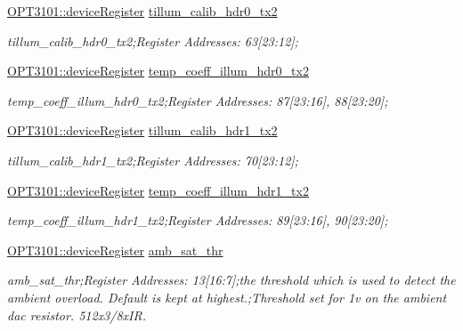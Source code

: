 \begin{DoxyCompactItemize}
\mbox{\hyperlink{class_o_p_t3101_1_1device_register}{O\+P\+T3101\+::device\+Register}} \mbox{\hyperlink{class_o_p_t3101_1_1registers_aef1c6804438384ec503ad3e8d688424a}{tillum\+\_\+calib\+\_\+hdr0\+\_\+tx2}}
\begin{DoxyCompactList}\small\item\em tillum\+\_\+calib\+\_\+hdr0\+\_\+tx2;Register Addresses\+: 63\mbox{[}23\+:12\mbox{]}; \end{DoxyCompactList}\item 
\mbox{\hyperlink{class_o_p_t3101_1_1device_register}{O\+P\+T3101\+::device\+Register}} \mbox{\hyperlink{class_o_p_t3101_1_1registers_aa4d94f77eab25d1a5f8c2ade09b16885}{temp\+\_\+coeff\+\_\+illum\+\_\+hdr0\+\_\+tx2}}
\begin{DoxyCompactList}\small\item\em temp\+\_\+coeff\+\_\+illum\+\_\+hdr0\+\_\+tx2;Register Addresses\+: 87\mbox{[}23\+:16\mbox{]}, 88\mbox{[}23\+:20\mbox{]}; \end{DoxyCompactList}\item 
\mbox{\hyperlink{class_o_p_t3101_1_1device_register}{O\+P\+T3101\+::device\+Register}} \mbox{\hyperlink{class_o_p_t3101_1_1registers_a52d7fbbebd3883af090f932aef0987cc}{tillum\+\_\+calib\+\_\+hdr1\+\_\+tx2}}
\begin{DoxyCompactList}\small\item\em tillum\+\_\+calib\+\_\+hdr1\+\_\+tx2;Register Addresses\+: 70\mbox{[}23\+:12\mbox{]}; \end{DoxyCompactList}\item 
\mbox{\hyperlink{class_o_p_t3101_1_1device_register}{O\+P\+T3101\+::device\+Register}} \mbox{\hyperlink{class_o_p_t3101_1_1registers_a5220d0e7faf65fac80f305b87c6cb078}{temp\+\_\+coeff\+\_\+illum\+\_\+hdr1\+\_\+tx2}}
\begin{DoxyCompactList}\small\item\em temp\+\_\+coeff\+\_\+illum\+\_\+hdr1\+\_\+tx2;Register Addresses\+: 89\mbox{[}23\+:16\mbox{]}, 90\mbox{[}23\+:20\mbox{]}; \end{DoxyCompactList}\item 
\mbox{\hyperlink{class_o_p_t3101_1_1device_register}{O\+P\+T3101\+::device\+Register}} \mbox{\hyperlink{class_o_p_t3101_1_1registers_a12bd5d02a0a04d12708531dd59c13542}{amb\+\_\+sat\+\_\+thr}}
\begin{DoxyCompactList}\small\item\em amb\+\_\+sat\+\_\+thr;Register Addresses\+: 13\mbox{[}16\+:7\mbox{]};the threshold which is used to detect the ambient overload. Default is kept at highest.;Threshold set for 1v on the ambient dac resistor. 512x3/8x\+IR. \end{DoxyCompactList}\item 

\end{DoxyCompactItemize}
